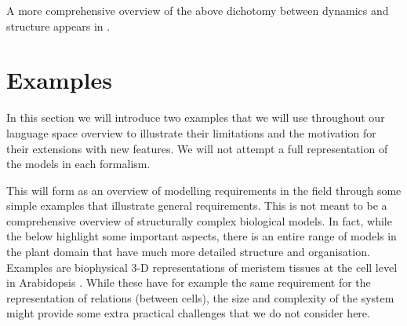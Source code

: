 A more comprehensive overview of the above dichotomy between dynamics and
structure appears in \citet{fontana1996barrier}.




\section{Examples}
\label{sec:examples}
In this section we will introduce two examples that we will use throughout our
language space overview to illustrate their limitations and the motivation
for their extensions with new features. We will not attempt a full
representation of the models in each formalism.

This will form as an overview of modelling requirements in the field through
some simple examples that illustrate general requirements. This is not meant to
be a comprehensive overview of structurally complex biological models. In fact,
while the below highlight some important aspects, there is an entire range of
models in the plant domain that have much more detailed structure and
organisation. Examples are biophysical 3-D representations of meristem tissues
at the cell level in Arabidopsis \citep{gruel_epidermis-driven_2016,
  willis_cell_2016}. While these have for example the same requirement for the
representation of relations (\eg between cells), the size and complexity of the
system might provide some extra practical challenges that we do not consider
here.

